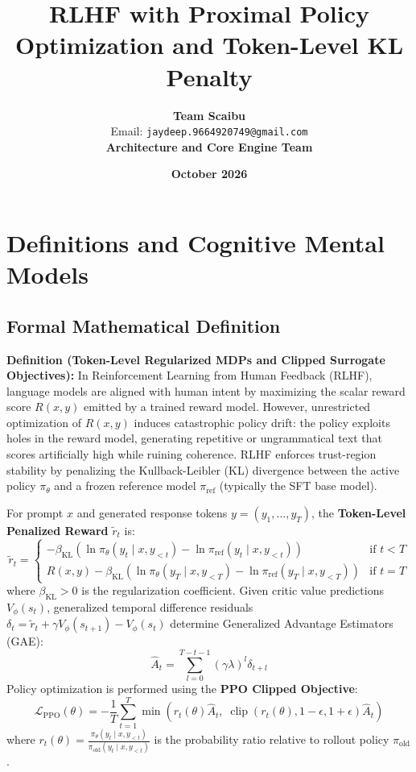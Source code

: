 \documentclass[11pt,a4paper]{article}
\title{\textbf{RLHF with Proximal Policy Optimization and Token-Level KL Penalty}}
\author{\textbf{Team Scaibu} \\ \small Email: \texttt{jaydeep.9664920749@gmail.com} \\ \small \textbf{Architecture and Core Engine Team}}
\date{\textbf{October 2026}}
\theoremstyle{definition}
\begin{document}
\maketitle

\section{Definitions and Cognitive Mental Models}

\subsection{Formal Mathematical Definition}
\textbf{Definition (Token-Level Regularized MDPs and Clipped Surrogate Objectives):}
In Reinforcement Learning from Human Feedback (RLHF), language models are aligned with human intent by maximizing the scalar reward score $R(x, y)$ emitted by a trained reward model. However, unrestricted optimization of $R(x, y)$ induces catastrophic policy drift: the policy exploits holes in the reward model, generating repetitive or ungrammatical text that scores artificially high while ruining coherence. RLHF enforces trust-region stability by penalizing the Kullback-Leibler (KL) divergence between the active policy $\pi_\theta$ and a frozen reference model $\pi_{\text{ref}}$ (typically the SFT base model).

For prompt $x$ and generated response tokens $y = (y_1, \dots, y_T)$, the \textbf{Token-Level Penalized Reward} $\tilde{r}_t$ is:
{\boldmath
\begin{equation}
\tilde{r}_t = \begin{cases} -\beta_{\text{KL}} \left( \ln \pi_\theta(y_t \mid x, y_{<t}) - \ln \pi_{\text{ref}}(y_t \mid x, y_{<t}) \right) & \text{if } t < T \\ R(x, y) - \beta_{\text{KL}} \left( \ln \pi_\theta(y_T \mid x, y_{<T}) - \ln \pi_{\text{ref}}(y_T \mid x, y_{<T}) \right) & \text{if } t = T \end{cases}
\end{equation}
}
where $\beta_{\text{KL}} > 0$ is the regularization coefficient.
Given critic value predictions $V_\phi(s_t)$, generalized temporal difference residuals $\delta_t = \tilde{r}_t + \gamma V_\phi(s_{t+1}) - V_\phi(s_t)$ determine Generalized Advantage Estimators (GAE):
{\boldmath
\begin{equation}
\hat{A}_t = \sum_{l=0}^{T - t - 1} (\gamma \lambda)^l \delta_{t+l}
\end{equation}
}
Policy optimization is performed using the \textbf{PPO Clipped Objective}:
{\boldmath
\begin{equation}
\mathcal{L}_{\text{PPO}}(\theta) = - \frac{1}{T}\sum_{t=1}^T \min\left( r_t(\theta) \hat{A}_t, \; \operatorname{clip}(r_t(\theta), 1 - \epsilon, 1 + \epsilon) \hat{A}_t \right)
\end{equation}
}
where $r_t(\theta) = \frac{\pi_\theta(y_t \mid x, y_{<t})}{\pi_{\text{old}}(y_t \mid x, y_{<t})}$ is the probability ratio relative to rollout policy $\pi_{\text{old}}$.
\end{document}
